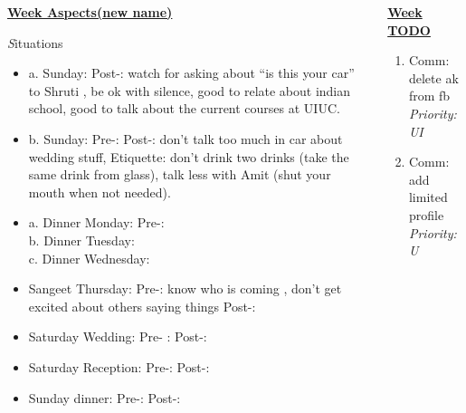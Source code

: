 \documentclass[serif,mathserif,final]{beamer}
\newcommand{\priority}[1]{\textit{Priority:} \textit{#1}}
\begin{document}
\begin{frame}{}
\begin{columns}[t]
\begin{column}{0.30\linewidth} {\textbf{\underline{Week Aspects(new name)}}}
\begin{block}{\textit Situations}
\begin{itemize}
      b. Saturday at Amit's house: Pre-: Post-: don't have to tell dad about when I first met Atul and Ridhima \\

\item \tiny 
  a. Sunday:  Post-: watch for asking about ``is this your car'' to Shruti ,  be ok with silence, good to relate about indian school, good to talk about the current courses at UIUC. \\

  \item \tiny  b. Sunday: Pre-: Post-: don't talk too much in car about wedding stuff, Etiquette: don't drink two drinks (take the same drink from glass), talk less with Amit (shut your mouth when not needed).\\

\item \tiny 
  
  a. Dinner Monday: Pre-:  \\ 
  b. Dinner Tuesday:   \\
  c. Dinner Wednesday:  \\

\item \tiny Sangeet Thursday: Pre-: know who is coming , don't get excited about others saying things Post-: 
\item \tiny Saturday Wedding: Pre- :   Post-: 
\item \tiny  Saturday Reception: Pre-:    Post-: 
\item \tiny  Sunday dinner:  Pre-:   Post-:  
    \end{itemize}
  \end{block} 
\end{column} %

\begin{column}{0.33\linewidth}{\textbf{\underline{Week TODO}}} 

\begin{block}

\begin{enumerate} 
\item \tiny Comm: delete ak from fb \priority{UI}  
\item \tiny Comm: add limited profile \priority{U} 


\end{enumerate}
\end{block}
\end{column}
\end{columns}
\end{frame}
\end{document}
